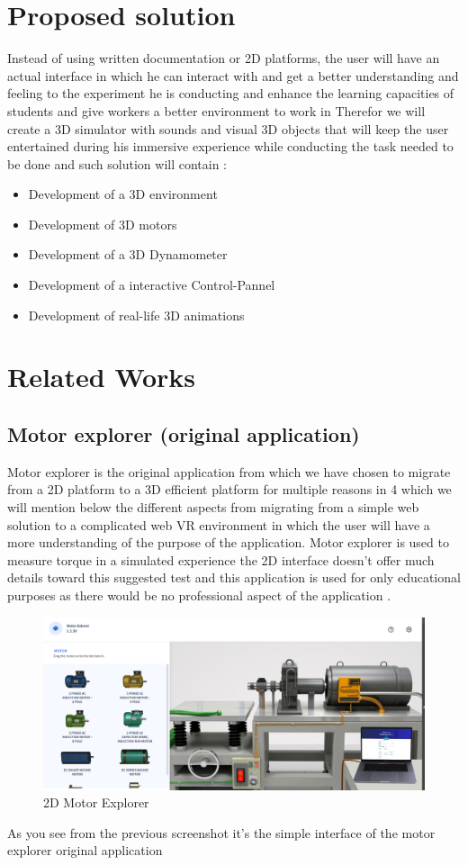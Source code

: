 \documentclass[]{report}
\begin{document}
\section{Proposed solution}
Instead of using written documentation or 2D platforms, the user will have an
actual interface in which he can interact with and get a better understanding and
feeling to the experiment he is conducting and enhance the learning capacities
of students and give workers a better environment to work in
Therefor we will create a 3D simulator with sounds and visual 3D objects that
will keep the user entertained during his immersive experience while
conducting the task needed to be done and such solution will contain :
\begin{itemize}
	\item Development of a 3D environment
	\item Development of 3D motors
	\item Development of a 3D Dynamometer
	\item Development of a interactive Control-Pannel
	\item Development of real-life 3D animations
\end{itemize}

\section{Related Works}
\subsection{Motor explorer (original application)}
Motor explorer is the original application from which we have chosen to
migrate from a 2D platform to a 3D efficient platform for multiple reasons in
4
which we will mention below the different aspects from migrating from a
simple web solution to a complicated web VR environment in which the user
will have a more understanding of the purpose of the application.
Motor explorer is used to measure torque in a simulated experience the 2D
interface doesn’t offer much details toward this suggested test and this
application is used for only educational purposes as there would be no
professional aspect of the application .

\begin{figure}[H]
	\begin{center}
		\includegraphics[scale=0.5, frame]{2dMotorExplorer.png}
	\end{center}
	\caption{2D Motor Explorer}
\end{figure}
As you see from the previous screenshot it’s the simple interface of the motor
explorer original application
\end{document}
